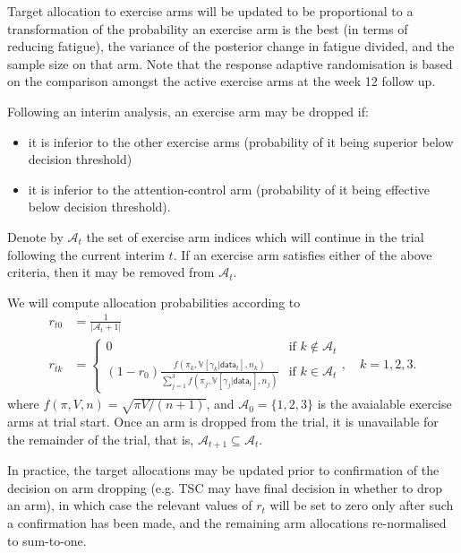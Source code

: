 \documentclass[11pt,parskip=half-]{scrartcl}
\providecommand{\tightlist}{%
  \setlength{\itemsep}{0pt}\setlength{\parskip}{0pt}}
\begin{document}
Target allocation to exercise arms will be updated to be proportional to a transformation of the probability an exercise arm is the best (in terms of reducing fatigue), the variance of the posterior change in fatigue divided, and the sample size on that arm. Note that the response adaptive randomisation is based on the comparison amongst the active exercise arms at the week 12 follow up.

Following an interim analysis, an exercise arm may be dropped if:
\begin{itemize}\tightlist
  \item it is inferior to the other exercise arms (probability of it being superior below decision threshold)
  \item it is inferior to the attention-control arm (probability of it being effective below decision threshold).
\end{itemize}

Denote by $\mathcal{A}_t$ the set of exercise arm indices which will continue in the trial following the current interim $t$. If an exercise arm satisfies either of the above criteria, then it may be removed from $\mathcal{A}_t$.

We will compute allocation probabilities according to
$$
  \begin{aligned}
    r_{t0} & = \frac{1}{|\mathcal{A}_t + 1|}              \\
    r_{tk} & = \begin{cases}
      0                                                                                                                                    & \text{if } k \notin \mathcal{A}_t \\
      (1 - r_0) \frac{f(\pi_k, \mathbb V[\gamma_k|\mathsf{data}_t], n_k)}{\sum_{j=1}^3 f(\pi_j, \mathbb V[\gamma_j|\mathsf{data}_t], n_j)} & \text{if }k\in\mathcal{A}_t
    \end{cases}, \quad k=1,2,3.
  \end{aligned}
$$
where $f(\pi, V, n) = \sqrt{\pi V/(n + 1)}$, and $\mathcal{A}_0 = \{1,2,3\}$ is the avaialable exercise arms at trial start. Once an arm is dropped from the trial, it is unavailable for the remainder of the trial, that is, $\mathcal{A}_{t+1} \subseteq \mathcal{A}_t$.

In practice, the target allocations may be updated prior to confirmation of the decision on arm dropping (e.g. TSC may have final decision in whether to drop an arm), in which case the relevant values of $r_t$ will be set to zero only after such a confirmation has been made, and the remaining arm allocations re-normalised to sum-to-one.
\end{document}
